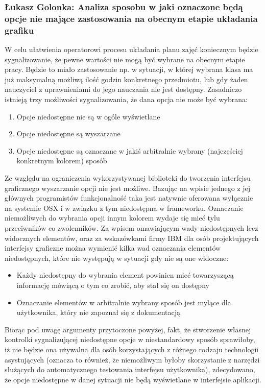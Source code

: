 \documentclass[12pt,a4paper,oneside]{article}
\theoremstyle{definition}
\numberwithin{equation}{section}
\begin{document}
\subsubsection{Łukasz Golonka: Analiza sposobu w jaki oznaczone będą opcje nie mające zastosowania na obecnym etapie układania grafiku}
W celu ułatwienia operatorowi procesu układania planu zajęć koniecznym będzie sygnalizowanie, że pewne wartości nie mogą być wybrane na obecnym etapie pracy. 
Będzie to miało zastosowanie np. w sytuacji, w której wybrana klasa ma już maksymalną możliwą ilość godzin konkretnego przedmiotu, lub gdy żaden nauczyciel z uprawnieniami do jego nauczania nie jest dostępny.
Zasadniczo istnieją trzy możliwości sygnalizowania, że dana opcja nie może być wybrana:
\begin{enumerate}
	\item Opcje niedostępne nie są w ogóle wyświetlane
	\item Opcje niedostępne są wyszarzane
	\item Opcje niedostępne są oznaczane w jakiś arbitralnie wybrany (najczęściej konkretnym kolorem) sposób
\end{enumerate}
Ze względu na ograniczenia wykorzystywanej biblioteki do tworzenia interfejsu graficznego wyszarzanie opcji nie jest możliwe.
Bazując na wpisie jednego z jej głównych programistów \cite{no_grayed_out} funkcjonalność taka jest natywnie oferowana wyłącznie na systemie OSX i w związku z tym niedostępna w frameworku.
Oznaczanie niemożliwych do wybrania opcji innym kolorem wydaje się mieć tylu przeciwników co zwolenników.
Za \cite{no_disabled} wpisem omawiającym wady niedostępnych lecz widocznych elementów, oraz za \cite {ibm_guide_lines} wskazówkami firmy IBM dla osób projektujących interfejsy graficzne można wymienić kilka wad oznaczania elementów niedostępnych, które nie występują w sytuacji gdy nie są one widoczne:
\begin{itemize}
	\item Każdy niedostępny do wybrania element powinien mieć towarzyszącą informację mówiącą o tym co zrobić, aby stał się on dostępny
	\item Oznaczanie elementów w arbitralnie wybrany sposób jest mylące dla użytkownika, który nie zapoznał się z dokumentacją
\end{itemize}
Biorąc pod uwagę argumenty przytoczone powyżej,
fakt, że stworzenie własnej kontrolki sygnalizującej niedostępne opcje w niestandardowy sposób sprawiłoby, iż nie będzie ona używalna dla osób korzystających z różnego rodzaju technologii asystujących
(oznacza to również, że niemożliwym byłoby skorzystanie z narzędzi służących do automatycznego testowania interfejsu użytkownika),
zdecydowano, że opcje niedostępne w danej sytuacji nie będą wyświetlane w interfejsie aplikacji.
\end{document}
